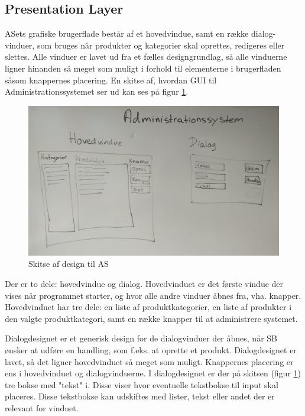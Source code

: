 \subsection{Presentation Layer}
\gls{AS}ets grafiske brugerflade består af et hovedvindue, samt en række dialog-vinduer, som bruges når produkter og kategorier skal oprettes, redigeres eller slettes. Alle vinduer er lavet ud fra et fælles designgrundlag, så alle vinduerne ligner hinanden så meget som muligt i forhold til elementerne i brugerfladen såsom knappernes placering. En skitse af, hvordan \gls{GUI} til Administrationssystemet ser ud kan ses på figur \ref{fig:admin_design}.

\begin{figure}[H]
	\centering
	\includegraphics[width=1\textwidth]{Systemdesign/backend/Images/AdminDesign}
	\caption{Skitse af design til \gls{AS}}
	\label{fig:admin_design}
\end{figure}

Der er to dele: hovedvindue og dialog. Hovedvinduet er det første vindue der vises når programmet starter, og hvor alle andre vinduer åbnes fra, vha. knapper. Hovedvinduet har tre dele: en liste af produktkategorier, en liste af produkter i den valgte produktkategori, samt en række knapper til at administrere systemet.

Dialogdesignet er et generisk design for de dialogvinduer der åbnes, når \gls{SB} ønsker at udføre en handling, som f.eks. at oprette et produkt. Dialogdesignet er lavet, så det ligner hovedvinduet så meget som muligt. Knappernes placering er ens i hovedvinduet og dialogvinduerne. I dialogdesignet er der på skitsen (figur \ref{fig:admin_design}) tre bokse med "tekst" i. Disse viser hvor eventuelle tekstbokse til input skal placeres. Disse tekstbokse kan udskiftes med lister, tekst eller andet der er relevant for vinduet.\\

